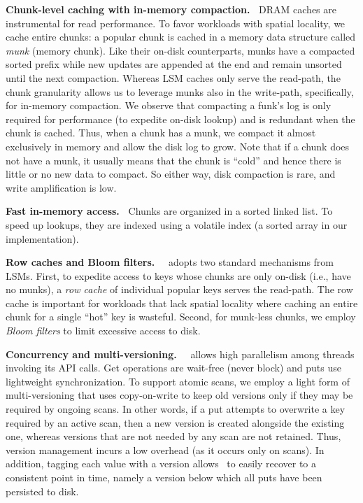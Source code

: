 {\bf Chunk-level caching with in-memory compaction.\ }
DRAM caches are instrumental for read performance. 
To favor workloads with spatial locality, we cache entire chunks:
a popular chunk is cached in a  memory data structure called \emph{munk} (memory chunk).
Like their on-disk counterparts, munks have a compacted sorted prefix while new updates are appended at the end and remain unsorted until the next compaction. 
Whereas LSM caches  only serve the read-path, the chunk granularity allows us to 
leverage munks also in the write-path, specifically, for in-memory compaction.  
We observe that 
compacting a funk's log is only required for performance (to expedite on-disk lookup) and is redundant when the chunk is cached. Thus, when 
a chunk has a munk, we compact it almost exclusively in memory and allow the disk log to grow. 
Note that if a chunk does not have a munk, it usually means that the chunk is ``cold'' 
and hence there is little or no new data to compact. So either way, disk compaction is rare, and write amplification is low.

{\bf Fast in-memory access.\ }
Chunks are organized in a sorted linked list. To speed up lookups, they are indexed using a volatile index (a sorted array in our implementation).  

 
 {\bf Row caches and Bloom filters.\ }
 \sys\ adopts two standard mechanisms from LSMs. First, to expedite access to  keys whose chunks are only on-disk  (i.e., have no munks), 
a \emph{row cache} of individual popular keys serves the read-path. The row cache is important for workloads that lack
spatial locality where caching an entire chunk for a single ``hot'' key is wasteful. 
Second, for munk-less chunks, we employ \emph{Bloom filters} to limit excessive access to disk. 

{\bf Concurrency and multi-versioning.\ }
 \sys\ allows high parallelism among threads invoking its API calls. 
 Get operations are wait-free (never block) and puts use lightweight synchronization. 
 To support atomic scans, we  employ a light form of multi-versioning that uses 
copy-on-write to keep old versions only if they may be required by ongoing scans. 
In other words, if a put attempts to overwrite a key required by an active scan, then a new version is created alongside the 
existing one, whereas versions that are not needed by any scan are not retained. 
Thus, version management incurs a low overhead (as it occurs only on scans). 
In addition, tagging each value with a version allows \sys\ to easily recover to a consistent point in time, namely a version below which all puts have been persisted to disk.


